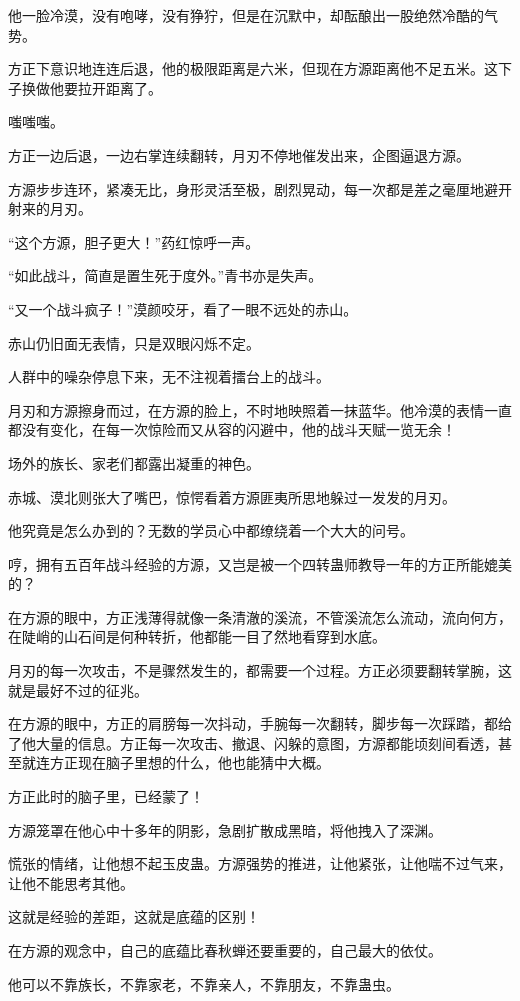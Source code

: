 \begin{this_body}
他一脸冷漠，没有咆哮，没有狰狞，但是在沉默中，却酝酿出一股绝然冷酷的气势。

方正下意识地连连后退，他的极限距离是六米，但现在方源距离他不足五米。这下子换做他要拉开距离了。

嗤嗤嗤。

方正一边后退，一边右掌连续翻转，月刃不停地催发出来，企图逼退方源。

方源步步连环，紧凑无比，身形灵活至极，剧烈晃动，每一次都是差之毫厘地避开射来的月刃。

“这个方源，胆子更大！”药红惊呼一声。

“如此战斗，简直是置生死于度外。”青书亦是失声。

“又一个战斗疯子！”漠颜咬牙，看了一眼不远处的赤山。

赤山仍旧面无表情，只是双眼闪烁不定。

人群中的噪杂停息下来，无不注视着擂台上的战斗。

月刃和方源擦身而过，在方源的脸上，不时地映照着一抹蓝华。他冷漠的表情一直都没有变化，在每一次惊险而又从容的闪避中，他的战斗天赋一览无余！

场外的族长、家老们都露出凝重的神色。

赤城、漠北则张大了嘴巴，惊愕看着方源匪夷所思地躲过一发发的月刃。

他究竟是怎么办到的？无数的学员心中都缭绕着一个大大的问号。

哼，拥有五百年战斗经验的方源，又岂是被一个四转蛊师教导一年的方正所能媲美的？

在方源的眼中，方正浅薄得就像一条清澈的溪流，不管溪流怎么流动，流向何方，在陡峭的山石间是何种转折，他都能一目了然地看穿到水底。

月刃的每一次攻击，不是骤然发生的，都需要一个过程。方正必须要翻转掌腕，这就是最好不过的征兆。

在方源的眼中，方正的肩膀每一次抖动，手腕每一次翻转，脚步每一次踩踏，都给了他大量的信息。方正每一次攻击、撤退、闪躲的意图，方源都能顷刻间看透，甚至就连方正现在脑子里想的什么，他也能猜中大概。

方正此时的脑子里，已经蒙了！

方源笼罩在他心中十多年的阴影，急剧扩散成黑暗，将他拽入了深渊。

慌张的情绪，让他想不起玉皮蛊。方源强势的推进，让他紧张，让他喘不过气来，让他不能思考其他。

这就是经验的差距，这就是底蕴的区别！

在方源的观念中，自己的底蕴比春秋蝉还要重要的，自己最大的依仗。

他可以不靠族长，不靠家老，不靠亲人，不靠朋友，不靠蛊虫。


\end{this_body}
